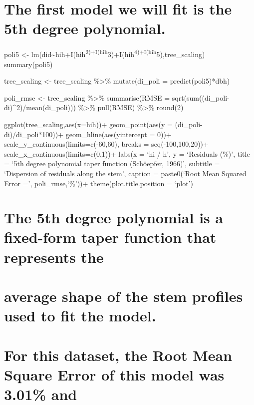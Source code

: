 \documentclass[
]{article}
\begin{document}
\hypertarget{the-first-model-we-will-fit-is-the-5th-degree-polynomial.}{%
\section{The first model we will fit is the 5th degree
polynomial.}\label{the-first-model-we-will-fit-is-the-5th-degree-polynomial.}}

poli5 \textless-
lm(did\textasciitilde hih+I(hih\textsuperscript{2)+I(hih}3)+I(hih\textsuperscript{4)+I(hih}5),tree\_scaling)
summary(poli5)

tree\_scaling \textless- tree\_scaling \%\textgreater\% mutate(di\_poli
= predict(poli5)*dbh)

poli\_rmse \textless- tree\_scaling \%\textgreater\% summarise(RMSE =
sqrt(sum((di\_poli-di)\^{}2)/mean(di\_poli))) \%\textgreater\%
pull(RMSE) \%\textgreater\% round(2)

ggplot(tree\_scaling,aes(x=hih))+ geom\_point(aes(y =
(di\_poli-di)/di\_poli*100))+ geom\_hline(aes(yintercept = 0))+
scale\_y\_continuous(limits=c(-60,60), breaks = seq(-100,100,20))+
scale\_x\_continuous(limits=c(0,1))+ labs(x = `hi / h', y = `Residuals
(\%)', title = `5th degree polynomial taper function (Schöepfer, 1966)',
subtitle = `Dispersion of residuals along the stem', caption =
paste0(`Root Mean Squared Error =', poli\_rmse,`\%'))+
theme(plot.title.position = `plot')

\hypertarget{the-5th-degree-polynomial-is-a-fixed-form-taper-function-that-represents-the}{%
\section{The 5th degree polynomial is a fixed-form taper function that
represents
the}\label{the-5th-degree-polynomial-is-a-fixed-form-taper-function-that-represents-the}}

\hypertarget{average-shape-of-the-stem-profiles-used-to-fit-the-model.}{%
\section{average shape of the stem profiles used to fit the
model.}\label{average-shape-of-the-stem-profiles-used-to-fit-the-model.}}

\hypertarget{for-this-dataset-the-root-mean-square-error-of-this-model-was-3.01-and}{%
\section{For this dataset, the Root Mean Square Error of this model was
3.01\%
and}\label{for-this-dataset-the-root-mean-square-error-of-this-model-was-3.01-and}}
\end{document}

